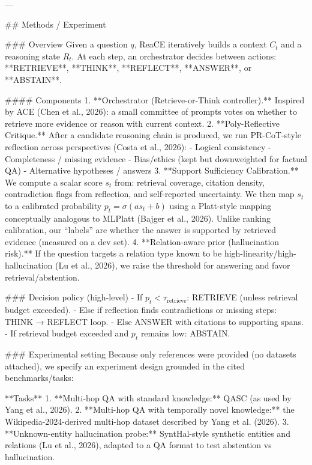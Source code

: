 ---

## Methods / Experiment  

### Overview  
Given a question \(q\), ReaCE iteratively builds a context \(C_t\) and a reasoning state \(R_t\). At each step, an orchestrator decides between actions: **RETRIEVE**, **THINK**, **REFLECT**, **ANSWER**, or **ABSTAIN**.

#### Components  
1. **Orchestrator (Retrieve-or-Think controller).** Inspired by ACE (Chen et al., 2026): a small committee of prompts votes on whether to retrieve more evidence or reason with current context.  
2. **Poly-Reflective Critique.** After a candidate reasoning chain is produced, we run PR-CoT-style reflection across perspectives (Costa et al., 2026):  
   - Logical consistency  
   - Completeness / missing evidence  
   - Bias/ethics (kept but downweighted for factual QA)  
   - Alternative hypotheses / answers  
3. **Support Sufficiency Calibration.** We compute a scalar score \(s_t\) from: retrieval coverage, citation density, contradiction flags from reflection, and self-reported uncertainty. We then map \(s_t\) to a calibrated probability \(p_t = \sigma(a s_t + b)\) using a Platt-style mapping conceptually analogous to MLPlatt (Bajger et al., 2026). Unlike ranking calibration, our “labels” are whether the answer is supported by retrieved evidence (measured on a dev set).  
4. **Relation-aware prior (hallucination risk).** If the question targets a relation type known to be high-linearity/high-hallucination (Lu et al., 2026), we raise the threshold for answering and favor retrieval/abstention.

### Decision policy (high-level)  
- If \(p_t < \tau_{\text{retrieve}}\): RETRIEVE (unless retrieval budget exceeded).  
- Else if reflection finds contradictions or missing steps: THINK → REFLECT loop.  
- Else ANSWER with citations to supporting spans.  
- If retrieval budget exceeded and \(p_t\) remains low: ABSTAIN.

### Experimental setting  
Because only references were provided (no datasets attached), we specify an experiment design grounded in the cited benchmarks/tasks:

**Tasks**
1. **Multi-hop QA with standard knowledge:** QASC (as used by Yang et al., 2026).  
2. **Multi-hop QA with temporally novel knowledge:** the Wikipedia-2024-derived multi-hop dataset described by Yang et al. (2026).  
3. **Unknown-entity hallucination probe:** SyntHal-style synthetic entities and relations (Lu et al., 2026), adapted to a QA format to test abstention vs hallucination.

